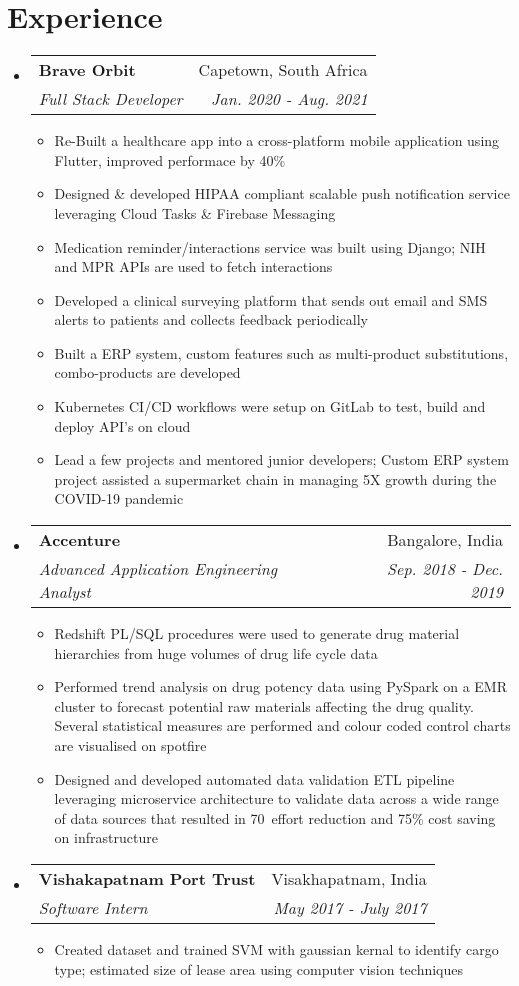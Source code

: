 \documentclass[letterpaper,10pt]{article}
\makeatletter
\newcommand{\resumeItemClean}[1]{
    \item\small{
        {#1 \vspace{-2pt}}
    }
}
\newcommand{\resumeSubheading}[4]{
  \vspace{-1pt}\item
    \begin{tabular*}{0.97\textwidth}[t]{l@{\extracolsep{\fill}}r}
      \textbf{#1} & #2 \\
      \textit{\small#3} & \textit{\small #4} \\
    \end{tabular*}\vspace{-5pt}
}
\newcommand{\resumeSubHeadingListStart}{\begin{itemize}[leftmargin=*]}
\newcommand{\resumeSubHeadingListEnd}{\end{itemize}}
\newcommand{\resumeItemListStart}{\begin{itemize}}
\newcommand{\resumeItemListEnd}{\end{itemize}\vspace{-5pt}}
\makeatother
\begin{document}
\section{Experience}
    \resumeSubHeadingListStart
    \resumeSubheading{Brave Orbit}{Capetown, South Africa}
        {Full Stack Developer}{Jan. 2020 - Aug. 2021}
            \resumeItemListStart
                \resumeItemClean
                    {Re-Built a healthcare app into a cross-platform mobile application using Flutter, improved performace by 40\%}
                  \resumeItemClean
                    {Designed \& developed HIPAA compliant scalable push notification service leveraging Cloud Tasks \& Firebase Messaging}
                  \resumeItemClean
                    {Medication reminder/interactions service was built using Django; NIH and MPR APIs are used to fetch interactions}
                  \resumeItemClean
                    {Developed a clinical surveying platform that sends out email and SMS alerts to patients and collects feedback periodically}
                  \resumeItemClean
                    {Built a ERP system, custom features such as multi-product substitutions, combo-products are developed}
                  \resumeItemClean
                    {Kubernetes CI/CD workflows were setup on GitLab to test, build and deploy API's on cloud}
                  \resumeItemClean
                    {Lead a few projects and mentored junior developers; Custom ERP system project assisted a supermarket chain in managing 5X growth during the COVID-19 pandemic}
              \resumeItemListEnd
    \resumeSubheading
    	{Accenture}{Bangalore, India}
    	{Advanced Application Engineering Analyst}{Sep. 2018 -  Dec. 2019}
    	    \resumeItemListStart
                \resumeItemClean
                  {Redshift PL/SQL procedures were used to generate drug material hierarchies from huge volumes of drug life cycle data}
                \resumeItemClean
                  {Performed trend analysis on drug potency data using PySpark on a EMR cluster to forecast potential raw materials affecting the drug quality. Several statistical measures are performed and colour coded control charts are visualised on spotfire}
                \resumeItemClean
                  {Designed and developed automated data validation ETL pipeline leveraging microservice architecture to validate data across a wide range of data sources that resulted in 70\
                  effort reduction and 75\% cost saving on infrastructure}
    	    \resumeItemListEnd
    \resumeSubheading
    	{Vishakapatnam Port Trust}{Visakhapatnam, India}
    	{Software Intern}{May 2017 -  July 2017}
    	    \resumeItemListStart
                \resumeItemClean
                  {Created dataset and trained SVM with gaussian kernal to identify cargo type; estimated size of lease area using computer vision techniques}
    	    \resumeItemListEnd
    \resumeSubHeadingListEnd
\end{document}
